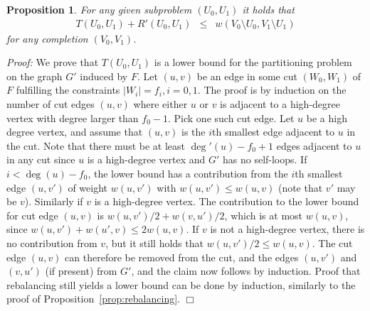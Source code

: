 \documentclass[a4paper,11pt]{article}
\newtheorem{proposition}{Proposition}
\newenvironment{proof}{\emph{Proof:}}{$\Box$\newline}
\begin{document}
\begin{proposition}
\label{prop:highdegree}
For any given subproblem $(U_0,U_1)$ it holds that
\begin{eqnarray*}
T(U_0,U_1)+R'(U_0,U_1) & \leq & w(V_0\setminus U_0,V_1\setminus U_1)
\end{eqnarray*}
for any completion $(V_0,V_1)$.
\end{proposition}

\begin{proof}
  We prove that $T(U_0,U_1)$ is a lower bound for the partitioning
  problem on the graph $G'$ induced by $F$. Let $(u,v)$ be an edge in
  some cut $(W_0,W_1)$ of $F$ fulfilling the constraints $|W_i|=f_i,
  i=0,1$. The proof is by induction on the number of cut edges $(u,v)$
  where either $u$ or $v$ is adjacent to a high-degree vertex with
  degree larger than $f_0-1$. Pick one such cut edge. Let $u$ be a
  high degree vertex, and assume that $(u,v)$ is the $i$th smallest
  edge adjacent to $u$ in the cut. Note that there must be at least
  $\deg'(u)-f_0+1$ edges adjacent to $u$ in any cut since $u$ is a
  high-degree vertex and $G'$ has no self-loops.  If $i<\deg(u)-f_0$,
  the lower bound has a contribution from the $i$th smallest edge
  $(u,v')$ of weight $w(u,v')$ with $w(u,v')\leq w(u,v)$ (note that
  $v'$ may be $v$). Similarly if $v$ is a high-degree vertex. The
  contribution to the lower bound for cut edge $(u,v)$ is
  $w(u,v')/2+w(v,u')/2$, which is at most $w(u,v)$, since
  $w(u,v')+w(u',v)\leq 2w(u,v)$. If $v$ is not a high-degree vertex,
  there is no contribution from $v$, but it still holds that
  $w(u,v')/2\leq w(u,v)$. The cut edge $(u,v)$ can therefore be
  removed from the cut, and the edges $(u,v')$ and $(v,u')$ (if
  present) from $G'$, and the claim now follows by induction. Proof
  that rebalancing still yields a lower bound can be done by
  induction, similarly to the proof of
  Proposition~\ref{prop:rebalancing}.
\end{proof}
\end{document}
